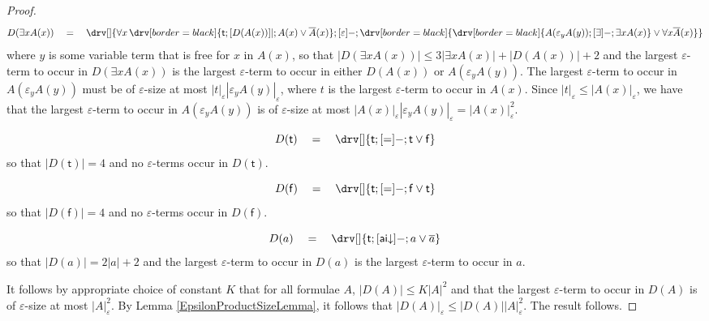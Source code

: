 \documentclass[10pt]{article}
\theoremstyle{definition}\newtheorem{remark}[theorem]{Remark}
\theoremstyle{definition}\newtheorem{example}[theorem]{Example}
\theoremstyle{definition}\newtheorem{definition}[theorem]{Definition}
\newcommand{\aiDown}{{\mathsf{ai\mathord\downarrow}}}
\newcommand{\falsifierRule}{{\mathsf{\varepsilon}}}
\newcommand{\trueUnit}{\mathsf{t}}
\newcommand{\falseUnit}{\mathsf{f}}
\begin{document}
\begin{proof}
		\[
		D(\exists x A(x)) \hspace{1em} = \hspace{1em} \drv[] {
			\forall x \, \drv[border=black] {
				\trueUnit ; [D(A(x))]| ; A(x) \lor \overline{A}(x)
			} ; [\falsifierRule]- ; \drv[border=black] {
				\drv[border=black] {
					A(\varepsilon_y A(y)) ; [\exists]- ; \exists x A(x)
				} \lor \forall x \overline{A}(x)
			}
		}
		\]
		where $y$ is some variable term that is free for $x$ in $A(x)$, so that $| D(\exists x A(x)) | \leq 3 | \exists x A(x) | + | D(A(x)) | + 2$ and the largest $\varepsilon$-term to occur in $D(\exists x A(x))$ is the largest $\varepsilon$-term to occur in either $D(A(x))$ or $A(\varepsilon_y A(y))$. The largest $\varepsilon$-term to occur in $A(\varepsilon_y A(y))$ must be of $\varepsilon$-size at most $| t |_\varepsilon | \varepsilon_y A(y) |_\varepsilon$, where $t$ is the largest $\varepsilon$-term to occur in $A(x)$. Since $| t |_\varepsilon \leq | A(x) |_\varepsilon$, we have that the largest $\varepsilon$-term to occur in $A(\varepsilon_y A(y))$ is of $\varepsilon$-size at most $| A(x) |_\varepsilon | \varepsilon_y A(y) |_\varepsilon = | A(x) |_\varepsilon^2$.
		
		\[
		D(\trueUnit) \hspace{1em} = \hspace{1em} \drv[] {
			\trueUnit ; [=]- ; \trueUnit \lor \falseUnit
		}
		\]
		so that $| D(\trueUnit) | = 4$ and no $\varepsilon$-terms occur in $D(\trueUnit)$.
		
		\[
		D(\falseUnit) \hspace{1em} = \hspace{1em} \drv[] {
			\trueUnit ; [=]- ; \falseUnit \lor \trueUnit
		}
		\]
		so that $| D(\falseUnit) | = 4$  and no $\varepsilon$-terms occur in $D(\falseUnit)$.
		
		\[
		D(a) \hspace{1em} = \hspace{1em} \drv[] {
			\trueUnit ; [\aiDown]- ; a \lor \overline{a}
		}
		\]
		so that $| D(a) | = 2 | a | + 2$ and the largest $\varepsilon$-term to occur in $D(a)$ is the largest $\varepsilon$-term to occur in $a$.
		
		It follows by appropriate choice of constant $K$ that for all formulae $A$, $| D(A) | \leq K| A |^2$ and that the largest $\varepsilon$-term to occur in $D(A)$ is of $\varepsilon$-size at most $| A |_\varepsilon^2$. By Lemma \ref{EpsilonProductSizeLemma}, it follows that $| D(A) |_\varepsilon \leq | D(A) | | A |_\varepsilon^2$. The result follows.
	\end{proof}
\end{document}
